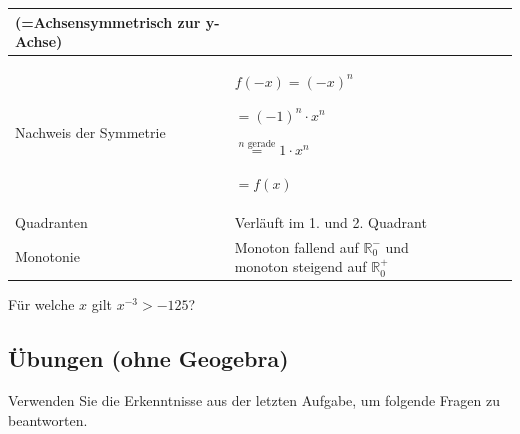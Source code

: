 \begin{landscape}
\begin{tabular}{|m{5cm}|m{4.5cm}|m{4.5cm}|m{4.5cm}|m{4.5cm}|}
        (=Achsensymmetrisch zur y-Achse)      &                                                                                                                              &                                                                        &                                                                                                   \\
        \hline
        Nachweis der Symmetrie                & $f(-x) =(-x)^n$

        $=(-1)^n\cdot x^n$

        $\stackrel{n \text{ gerade}}{=} 1\cdot x^n$

        $=f(x)$                               &                                                                                                                              &                                                                        &                                                                                                   \\
        \hline
        Quadranten                            & Verläuft im 1. und 2. Quadrant                                                                                               &                                                                        &                                                                        &                          \\
        \hline
        Monotonie                             & Monoton fallend auf $\mathbb{R}^-_0$ und monoton steigend auf $\mathbb{R}^+_0$                                               &                                                                        &                                                                        &                          \\ \hline
    \end{tabular}
\end{landscape}

\begin{example}
    Für welche $x$ gilt $x^{-3}>-125$?
\end{example}

\subsection{Übungen (ohne Geogebra)}
Verwenden Sie die Erkenntnisse aus der letzten Aufgabe, um folgende Fragen zu beantworten.

